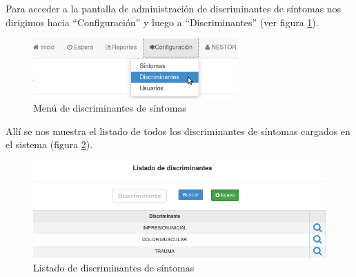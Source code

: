 \label{cap:ABM_discriminantes}
Para acceder a la pantalla de administración de discriminantes de síntomas nos dirigimos hacia ``Configuración'' y luego a ``Discriminantes'' (ver figura \ref{fig:menu_discriminantes}).
\begin{figure}
\centerline{\includegraphics[width=0.7\textwidth]{menu_discriminantes.png}}
\caption{Menú de discriminantes de síntomas}
\label{fig:menu_discriminantes}
\end{figure}
Allí se nos muestra el listado de todos los discriminantes de síntomas cargados en el sistema (figura \ref{fig:listado_discriminantes}).
\begin{figure}
\centerline{\includegraphics[width=1\textwidth]{listado_discriminantes.png}}
\caption{Listado de discriminantes de síntomas}
\label{fig:listado_discriminantes}
\end{figure}

